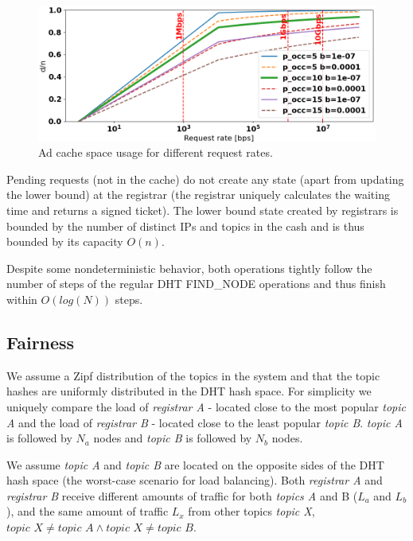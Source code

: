 \begin{figure}[t]
    \includegraphics[width=1\linewidth]{img/cache_size_limit}
    \caption{Ad cache space usage for different request rates.
    }
    \label{fig:cache_size_limit}
\end{figure}
Pending requests (\ie not in the cache) do not create any state (apart from updating the lower bound) at the registrar (\ie the registrar uniquely calculates the waiting time and returns a signed ticket). The lower bound state created by registrars is bounded by the number of distinct IPs and topics in the cash and is thus bounded by its capacity $O(n)$.

Despite some nondeterministic behavior, both operations tightly follow the number of steps of the regular DHT FIND\_NODE operations and thus finish within $O(log(N))$ steps.

\subsection{Fairness}
We assume a Zipf distribution of the topics in the system and that the topic hashes are uniformly distributed in the DHT hash space. For simplicity we uniquely compare the load of \emph{registrar A} - located close to the most popular \emph{topic A} and the load of \emph{registrar B} - located close to the least popular \emph{topic B}. \emph{topic A} is followed by $N_a$ nodes and \emph{topic B} is followed by $N_b$ nodes. 

We assume \emph{topic A} and \emph{topic B} are located on the opposite sides of the DHT hash space (the worst-case scenario for load balancing). Both \emph{registrar A} and \emph{registrar B} receive different amounts of traffic for both \emph{topics A} and {B} ($L_a$ and $L_b$), and the same amount of traffic $L_x$ from other topics \emph{topic X}, $\textit{topic X} \neq \textit{topic A} \land  \textit{topic X} \neq \textit{topic B}$. 

